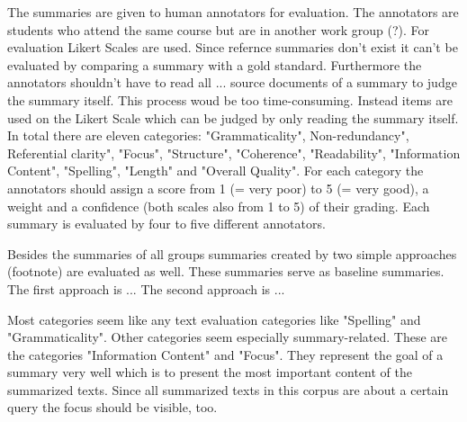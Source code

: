 The summaries are given to human annotators for evaluation. The annotators are students who attend the same course but are in another work group (?). For evaluation Likert Scales are used. Since refernce summaries don't exist it can't be evaluated by comparing a summary with a gold standard. Furthermore the annotators shouldn't have to read all ... source documents of a summary to judge the summary itself. This process woud be too time-consuming. Instead items are used on the Likert Scale which can be judged by only reading the summary itself. In total there are eleven categories: "Grammaticality", Non-redundancy", Referential clarity", "Focus", "Structure", "Coherence", "Readability", "Information Content", "Spelling", "Length" and "Overall Quality". For each category the annotators should assign a score from 1 (= very poor) to 5 (= very good), a weight and a confidence (both scales also from 1 to 5) of their grading. Each summary is evaluated by four to five different annotators.

Besides the summaries of all groups summaries created by two simple approaches (footnote) are evaluated as well. These summaries serve as baseline summaries. The first approach is ... The second approach is ... 


Most categories seem like any text evaluation categories like "Spelling" and "Grammaticality". Other categories seem especially summary-related. These are the categories "Information Content" and "Focus". They represent the goal of a summary very well which is to present the most important content of the summarized texts. Since all summarized texts in this corpus are about a certain query the focus should be visible, too.

